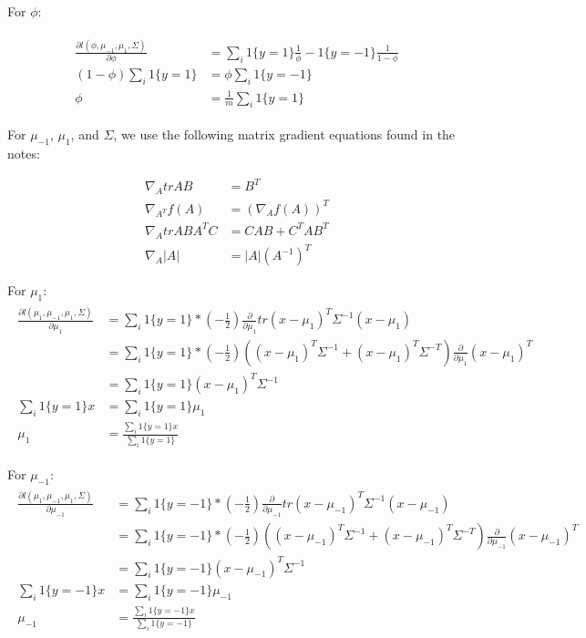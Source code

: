 \documentclass[11pt]{article}
\begin{document}
For $\phi$:

\begin{align}
	\begin{split}
		\frac{\partial l(\phi, \mu_{-1}, \mu_{1}, \Sigma)}{\partial \phi} &= 
        \sum_{i}1\{y=1\}\frac{1}{\phi} - 1\{y=-1\}\frac{1}{1-\phi} \\ 
		(1-\phi)\sum_{i}1\{y=1\} &= \phi \sum_{i}1\{y=-1\} \\
        \phi &= \frac{1}{m} \sum_{i}1\{y=1\}
  \end{split}
\end{align}

For $\mu_{-1}$, $\mu_1$, and $\Sigma$, we use the following matrix gradient equations found in
the notes:

\begin{align}
	\nabla_{A}trAB &= B^T \\
  \nabla_{A^T}f(A) &= (\nabla_{A}f(A))^T \\
  \nabla_{A}trABA^TC &= CAB + C^TAB^T \\
  \nabla_{A}|A| &= |A|(A^{-1})^T
\end{align}

For $\mu_1$:
\begin{align}
	\begin{split}
		\frac{\partial l(\mu_1, \mu_{-1}, \mu_{1}, \Sigma)}{\partial \mu_1} &= 
       \sum_{i}1\{y=1\}*(-\frac{1}{2})\frac{\partial}{\partial \mu_1}tr(x-\mu_1)^T\Sigma^{-1}(x-\mu_1) \\
			 &= \sum_{i}1\{y=1\}*(-\frac{1}{2})((x-\mu_1)^T\Sigma^{-1} + (x-\mu_1)^T\Sigma^{-T})\frac{\partial}{\partial \mu_1}(x-\mu_1)^T \\
			 &= \sum_{i}1\{y=1\}(x-\mu_1)^T\Sigma^{-1} \\
		\sum_{i}1\{y=1\}x &= \sum_{i}1\{y=1\}\mu_1 \\
		\mu_1 &= \frac{\sum_{i}1\{y=1\}x}{\sum_{i}1\{y=1\}}
	\end{split}
\end{align}

For $\mu_{-1}$:
\begin{align}
	\begin{split}
		\frac{\partial l(\mu_1, \mu_{-1}, \mu_{1}, \Sigma)}{\partial \mu_{-1}} &= 
			 \sum_{i}1\{y=-1\}*(-\frac{1}{2})\frac{\partial}{\partial \mu_{-1}}tr(x-\mu_{-1})^T\Sigma^{-1}(x-\mu_{-1}) \\
			 &= \sum_{i}1\{y=-1\}*(-\frac{1}{2})((x-\mu_{-1})^T\Sigma^{-1} + (x-\mu_{-1})^T\Sigma^{-T})\frac{\partial}{\partial \mu_{-1}}(x-\mu_{-1})^T \\
			 &= \sum_{i}1\{y=-1\}(x-\mu_{-1})^T\Sigma^{-1} \\
		\sum_{i}1\{y=-1\}x &= \sum_{i}1\{y=-1\}\mu_{-1} \\
		\mu_{-1} &= \frac{\sum_{i}1\{y=-1\}x}{\sum_{i}1\{y=-1\}}
	\end{split}
\end{align}
\end{document}
